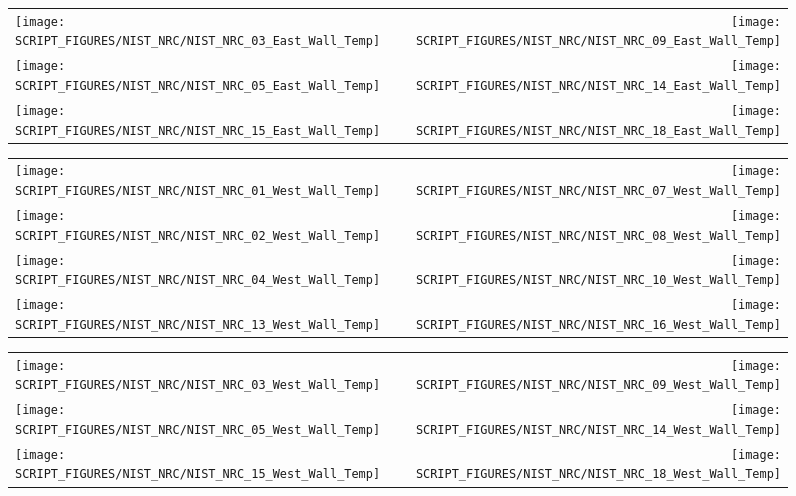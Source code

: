 \begin{figure}[p]
\begin{tabular*}{\textwidth}{l@{\extracolsep{\fill}}r}
\texttt{[image: SCRIPT\_FIGURES/NIST\_NRC/NIST\_NRC\_03\_East\_Wall\_Temp]} &
\texttt{[image: SCRIPT\_FIGURES/NIST\_NRC/NIST\_NRC\_09\_East\_Wall\_Temp]} \\
\texttt{[image: SCRIPT\_FIGURES/NIST\_NRC/NIST\_NRC\_05\_East\_Wall\_Temp]} &
\texttt{[image: SCRIPT\_FIGURES/NIST\_NRC/NIST\_NRC\_14\_East\_Wall\_Temp]} \\
\texttt{[image: SCRIPT\_FIGURES/NIST\_NRC/NIST\_NRC\_15\_East\_Wall\_Temp]} &
\texttt{[image: SCRIPT\_FIGURES/NIST\_NRC/NIST\_NRC\_18\_East\_Wall\_Temp]}
\end{tabular*}
\label{NIST_NRC_East_Wall_Temp_Open}
\end{figure}

\begin{figure}[p]
\begin{tabular*}{\textwidth}{l@{\extracolsep{\fill}}r}
\texttt{[image: SCRIPT\_FIGURES/NIST\_NRC/NIST\_NRC\_01\_West\_Wall\_Temp]} &
\texttt{[image: SCRIPT\_FIGURES/NIST\_NRC/NIST\_NRC\_07\_West\_Wall\_Temp]} \\
\texttt{[image: SCRIPT\_FIGURES/NIST\_NRC/NIST\_NRC\_02\_West\_Wall\_Temp]} &
\texttt{[image: SCRIPT\_FIGURES/NIST\_NRC/NIST\_NRC\_08\_West\_Wall\_Temp]} \\
\texttt{[image: SCRIPT\_FIGURES/NIST\_NRC/NIST\_NRC\_04\_West\_Wall\_Temp]} &
\texttt{[image: SCRIPT\_FIGURES/NIST\_NRC/NIST\_NRC\_10\_West\_Wall\_Temp]} \\
\texttt{[image: SCRIPT\_FIGURES/NIST\_NRC/NIST\_NRC\_13\_West\_Wall\_Temp]} &
\texttt{[image: SCRIPT\_FIGURES/NIST\_NRC/NIST\_NRC\_16\_West\_Wall\_Temp]}
\end{tabular*}
\label{NIST_NRC_West_Wall_Temp_Closed}
\end{figure}

\begin{figure}[p]
\begin{tabular*}{\textwidth}{l@{\extracolsep{\fill}}r}
\texttt{[image: SCRIPT\_FIGURES/NIST\_NRC/NIST\_NRC\_03\_West\_Wall\_Temp]} &
\texttt{[image: SCRIPT\_FIGURES/NIST\_NRC/NIST\_NRC\_09\_West\_Wall\_Temp]} \\
\texttt{[image: SCRIPT\_FIGURES/NIST\_NRC/NIST\_NRC\_05\_West\_Wall\_Temp]} &
\texttt{[image: SCRIPT\_FIGURES/NIST\_NRC/NIST\_NRC\_14\_West\_Wall\_Temp]} \\
\texttt{[image: SCRIPT\_FIGURES/NIST\_NRC/NIST\_NRC\_15\_West\_Wall\_Temp]} &
\texttt{[image: SCRIPT\_FIGURES/NIST\_NRC/NIST\_NRC\_18\_West\_Wall\_Temp]}
\end{tabular*}
\label{NIST_NRC_West_Wall_Temp_Open}
\end{figure}

